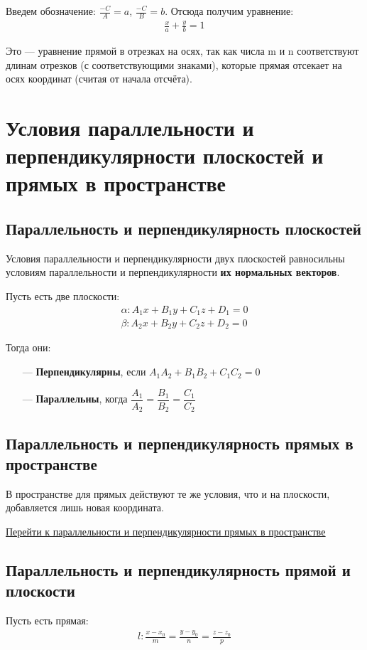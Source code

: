 \documentclass[a4paper,12pt]{extbook}
\theoremstyle{named}
\theoremstyle{named}
\begin{document}
Введем обозначение: \(\frac{-C}{A} = a\), \(\frac{-C}{B} = b\).
Отсюда получим уравнение:
\begin{gather*}
    \frac{x}{a} + \frac{y}{b} = 1
\end{gather*}

Это — уравнение прямой в отрезках на осях, так как числа m и n соответствуют длинам отрезков (с соответствующими знаками), которые прямая отсекает на осях координат (считая от начала отсчёта).



\section{Условия параллельности и перпендикулярности плоскостей и прямых в пространстве}
\label{sec:parallel_perpendicular_planes}

\subsection*{Параллельность и перпендикулярность плоскостей}
Условия параллельности и перпендикулярности двух плоскостей равносильны условиям параллельности и перпендикулярности \textbf{их нормальных векторов}.

Пусть есть две плоскости:
\begin{gather*}
    \alpha: A_1x + B_1y + C_1z + D_1 = 0 \\
    \beta: A_2x + B_2y + C_2z + D_2 = 0
\end{gather*}

Тогда они:
\begin{itemize}
    \item[—]{\textbf{Перпендикулярны}, если \(A_1A_2 + B_1B_2 + C_1C_2 = 0\)}
    \item[—]{\textbf{Параллельны}, когда \(\dfrac{A_1}{A_2} = \dfrac{B_1}{B_2} = \dfrac{C_1}{C_2}\)}
\end{itemize}

\subsection*{Параллельность и перпендикулярность прямых в пространстве}
В пространстве для прямых действуют те же условия, что и на плоскости, добавляется лишь новая координата.

\hyperref[sec:parallel_perpendicular_lines]{\underline{Перейти к параллельности и перпендикулярности прямых в пространстве}}

\subsection*{Параллельность и перпендикулярность прямой и плоскости}
Пусть есть прямая:
\begin{gather*}
    l: \frac{x - x_0}{m} = \frac{y - y_0}{n} = \frac{z - z_0}{p}
\end{gather*}
\end{document}
